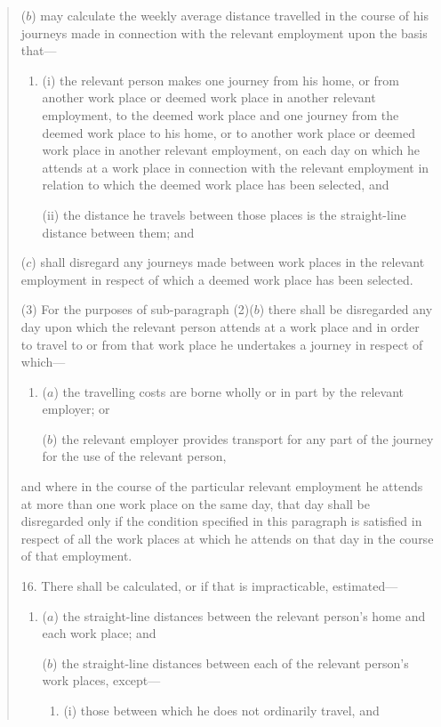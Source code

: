 \documentclass[12pt,a4paper]{article}
\begin{document}
\begin{quotation}
\begin{enumerate}
($b$) may calculate the weekly average distance travelled in the course of his journeys made in connection with the relevant employment upon the basis that—
\begin{enumerate}\item[]
(i) the relevant person makes one journey from his home, or from another work place or deemed work place in another relevant employment, to the deemed work place and one journey from the deemed work place to his home, or to another work place or deemed work place in another relevant employment, on each day on which he attends at a work place in connection with the relevant employment in relation to which the deemed work place has been selected, and

(ii) the distance he travels between those places is the straight-line distance between them; and
\end{enumerate}

($c$) shall disregard any journeys made between work places in the relevant employment in respect of which a deemed work place has been selected.
\end{enumerate}

(3) For the purposes of sub-paragraph (2)($b$) there shall be disregarded any day upon which the relevant person attends at a work place and in order to travel to or from that work place he undertakes a journey in respect of which—
\begin{enumerate}\item[]
($a$) the travelling costs are borne wholly or in part by the relevant employer; or

($b$) the relevant employer provides transport for any part of the journey for the use of the relevant person,
\end{enumerate}
and where in the course of the particular relevant employment he attends at more than one work place on the same day, that day shall be disregarded only if the condition specified in this paragraph is satisfied in respect of all the work places at which he attends on that day in the course of that employment.

\medskip

16.  There shall be calculated, or if that is impracticable, estimated—
\begin{enumerate}\item[]
($a$) the straight-line distances between the relevant person’s home and each work place; and

($b$) the straight-line distances between each of the relevant person’s work places, except—
\begin{enumerate}\item[]
(i) those between which he does not ordinarily travel, and


\end{enumerate}
\end{enumerate}
\end{quotation}
\end{document}

